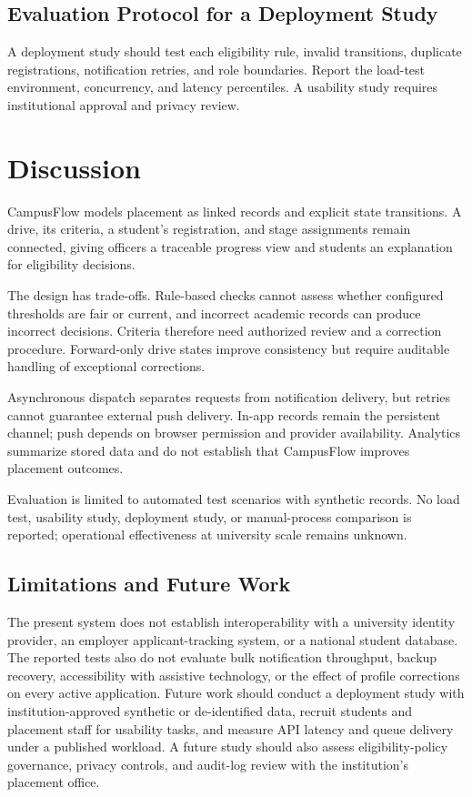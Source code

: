\documentclass[conference,final]{IEEEtran}
\begin{document}
\subsection{Evaluation Protocol for a Deployment Study}
A deployment study should test each eligibility rule, invalid transitions, duplicate registrations, notification retries, and role boundaries. Report the load-test environment, concurrency, and latency percentiles. A usability study requires institutional approval and privacy review.

\section{Discussion}
CampusFlow models placement as linked records and explicit state transitions. A drive, its criteria, a student's registration, and stage assignments remain connected, giving officers a traceable progress view and students an explanation for eligibility decisions.

The design has trade-offs. Rule-based checks cannot assess whether configured thresholds are fair or current, and incorrect academic records can produce incorrect decisions. Criteria therefore need authorized review and a correction procedure. Forward-only drive states improve consistency but require auditable handling of exceptional corrections.

Asynchronous dispatch separates requests from notification delivery, but retries cannot guarantee external push delivery. In-app records remain the persistent channel; push depends on browser permission and provider availability. Analytics summarize stored data and do not establish that CampusFlow improves placement outcomes.

Evaluation is limited to automated test scenarios with synthetic records. No load test, usability study, deployment study, or manual-process comparison is reported; operational effectiveness at university scale remains unknown.

\subsection{Limitations and Future Work}
The present system does not establish interoperability with a university identity provider, an employer applicant-tracking system, or a national student database. The reported tests also do not evaluate bulk notification throughput, backup recovery, accessibility with assistive technology, or the effect of profile corrections on every active application. Future work should conduct a deployment study with institution-approved synthetic or de-identified data, recruit students and placement staff for usability tasks, and measure API latency and queue delivery under a published workload. A future study should also assess eligibility-policy governance, privacy controls, and audit-log review with the institution's placement office.
\end{document}
